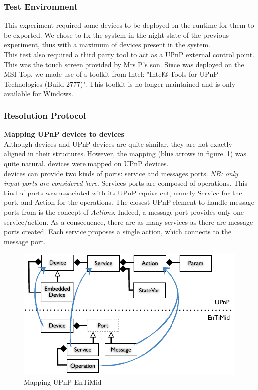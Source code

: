 \subsubsection{Test Environment}

This experiment required some devices to be deployed on the runtime for them to be exported. We chose to fix the system in the night state of the previous experiment, thus with a maximum of devices present in the system.\\
This test also required a third party tool to act as a UPnP external control point. This was the touch screen provided by Mrs P.'s son. Since \enti{} was deployed on the MSI Top, we made use of a toolkit from Intel: "Intel® Tools for UPnP Technologies (Build 2777)". This toolkit is no longer maintained and is only available for Windows.

\subsubsection{Resolution Protocol}

{\bf Mapping UPnP devices to \enti{} devices}\\
Although \enti{} devices and UPnP devices are quite similar, they are not exactly aligned in their structures. However, the mapping (blue arrows in figure~\ref{fig:upnp-mapping}) was quite natural. \enti{} devices were mapped on UPnP devices.\\
\enti{} devices can provide two kinds of ports: service and messages ports. {\it NB: only input ports are considered here}. Services ports are composed of operations. This kind of ports was associated with its UPnP equivalent, namely Service for the port, and Action for the operations. The closest UPnP element to handle message ports from \enti{} is the concept of {\it Actions}. Indeed, a message port provides only one service/action. As a consequence, there are as many services as there are message ports created. Each service proposes a single action, which connects to the message port.\\

\begin{figure}
\centering
\includegraphics[]{part4/pics/UPnPMapping}
\caption{Mapping UPnP-EnTiMid}
\label{fig:upnp-mapping}
\end{figure}

